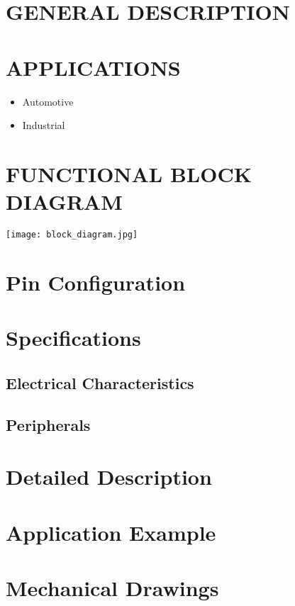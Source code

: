 \documentclass{../templates/datasheet}
\begin{document}
\section{GENERAL DESCRIPTION}
\section{APPLICATIONS}
\begin{itemize}
	\item Automotive
	\item Industrial
\end{itemize}

\section{FUNCTIONAL BLOCK DIAGRAM}
\texttt{[image: block\_diagram.jpg]}


\pagebreak
\tableofcontents
\pagebreak



\section{Pin Configuration}

\section{Specifications}
\subsection{Electrical Characteristics}
\subsection{Peripherals}




\section{Detailed Description}

\section{Application Example}

\section{Mechanical Drawings}
\end{document}
